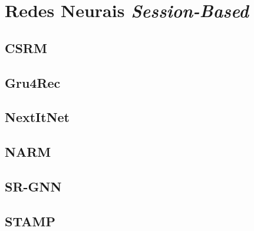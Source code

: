 \section{Redes Neurais \textit{Session-Based}}
\subsection{CSRM}
\subsection{Gru4Rec}
\subsection{NextItNet}
\subsection{NARM}
\subsection{SR-GNN}
\subsection{STAMP}